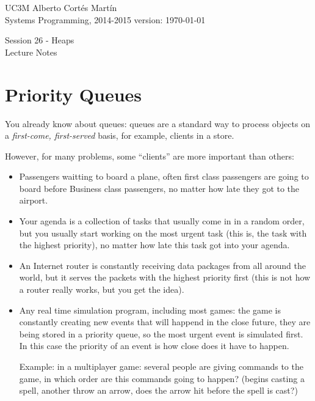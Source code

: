 \documentclass[a4paper, 9pt]{extarticle}
\newcommand{\realtitle}{Session 26 - Heaps}
\begin{document}
\makebox[\linewidth]{\rule{\textwidth}{0.4pt}}
UC3M \hfill Alberto Cortés Martín\\
Systems Programming, 2014-2015 \hfill version: \today\\
\makebox[\linewidth]{\rule{\textwidth}{0.4pt}}
\begin{center}
  \Large{\realtitle}\\Lecture Notes
\end{center}
\makebox[\linewidth]{\rule{\textwidth}{0.4pt}}
\vspace{1cm}


\section{Priority Queues}

You already know about queues: queues are a standard way to process objects on
a \emph{first-come, first-served} basis, for example, clients in a store.

However, for many problems, some ``clients'' are more important than others:

\begin{itemize}

  \item Passengers waitting to board a plane, often first class passengers are
    going to board before Business class passengers, no matter how late they
    got to the airport.

  \item Your agenda is a collection of tasks that usually come in in a random
    order, but you usually start working on the most urgent task (this is, the
    task with the highest priority), no matter how late this task got into your
    agenda.

  \item An Internet router is constantly receiving data packages from all
    around the world, but it serves the packets with the highest priority
    first (this is not how a router really works, but you get the idea).

  \item Any real time simulation program, including most games: the game is
    constantly creating new events that will happend in the close future, they
    are being stored in a priority queue, so the most urgent event is simulated
    first. In this case the priority of an event is how close does it have to
    happen.

    Example: in a multiplayer game: several people are giving commands to the
    game, in which order are this commands going to happen? (begins casting a
    spell, another throw an arrow, does the arrow hit before the spell is
    cast?)

\end{itemize}
\end{document}
